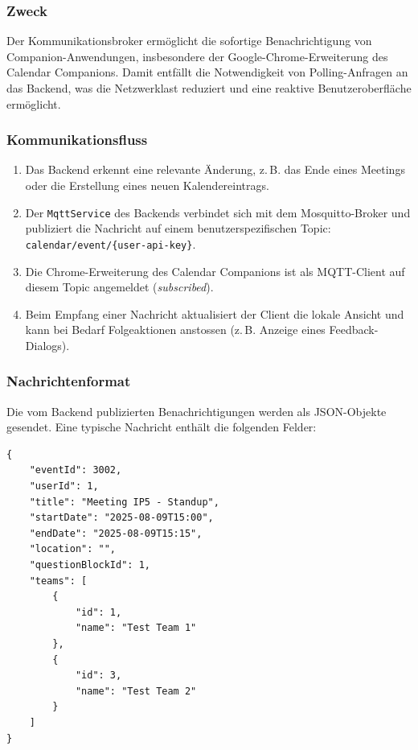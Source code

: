 \documentclass[12pt,a4paper]{report}
\begin{document}
    \subsubsection{Zweck}
        Der Kommunikationsbroker ermöglicht die sofortige Benachrichtigung von Companion-Anwendungen, insbesondere der Google-Chrome-Erweiterung des Calendar Companions.
        Damit entfällt die Notwendigkeit von Polling-Anfragen an das Backend, was die Netzwerklast reduziert und eine reaktive Benutzeroberfläche ermöglicht.

    \subsubsection{Kommunikationsfluss}
        \begin{enumerate}
            \item Das Backend erkennt eine relevante Änderung, z.\,B. das Ende eines Meetings oder die Erstellung eines neuen Kalendereintrags.
            \item Der \texttt{MqttService} des Backends verbindet sich mit dem Mosquitto-Broker und publiziert die Nachricht auf einem benutzerspezifischen Topic:
                \texttt{calendar/event/\{user-api-key\}}.
            \item Die Chrome-Erweiterung des Calendar Companions ist als MQTT-Client auf diesem Topic angemeldet (\textit{subscribed}).
            \item Beim Empfang einer Nachricht aktualisiert der Client die lokale Ansicht und kann bei Bedarf Folgeaktionen anstossen (z.\,B. Anzeige eines Feedback-Dialogs).
        \end{enumerate}

    \subsubsection{Nachrichtenformat}
        Die vom Backend publizierten Benachrichtigungen werden als JSON-Objekte gesendet.
        Eine typische Nachricht enthält die folgenden Felder:

\begin{verbatim}
{
    "eventId": 3002,
    "userId": 1,
    "title": "Meeting IP5 - Standup",
    "startDate": "2025-08-09T15:00",
    "endDate": "2025-08-09T15:15",
    "location": "",
    "questionBlockId": 1,
    "teams": [
        {
            "id": 1,
            "name": "Test Team 1"
        },
        {
            "id": 3,
            "name": "Test Team 2"
        }
    ]
}
\end{verbatim}
\end{document}
